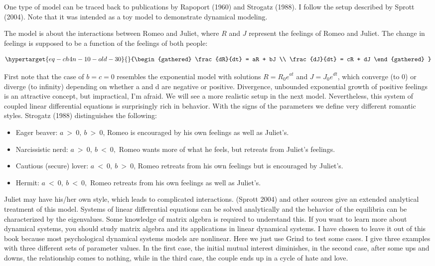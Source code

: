 \documentclass[
  a4paper,
  DIV=11,
  numbers=noendperiod]{scrreprt}
\begin{document}
One type of model can be traced back to publications by Rapoport (1960)
and Strogatz (1988). I follow the setup described by Sprott (2004). Note
that it was intended as a toy model to demonstrate dynamical modeling.

The model is about the interactions between Romeo and Juliet, where
\(R\) and \(J\) represent the feelings of Romeo and Juliet. The change
in feelings is supposed to be a function of the feelings of both people:

\begin{equation}\protect\hypertarget{eq-ch4n-10-old-30}{}{\begin{gathered}
\frac{dR}{dt} = aR + bJ \\
\frac{dJ}{dt} = cR + dJ
\end{gathered}
}\label{eq-ch4n-10-old-30}\end{equation}

First note that the case of \(b = c = 0\) resembles the exponential
model with solutions \(R = {R_{0}e}^{at}\) and \(J = {J_{0}e}^{dt}\),
which converge (to 0) or diverge (to infinity) depending on whether a
and d are negative or positive. Divergence, unbounded exponential growth
of positive feelings is an attractive concept, but impractical, I'm
afraid. We will see a more realistic setup in the next model.
Nevertheless, this system of coupled linear differential equations is
surprisingly rich in behavior. With the signs of the parameters we
define very different romantic styles. Strogatz (1988) distinguishes the
following:

\begin{itemize}
\item
  Eager beaver: \(a\  > \ 0,\ b\  > \ 0\), Romeo is encouraged by his
  own feelings as well as Juliet's.
\item
  Narcissistic nerd: \(a\  > \ 0,\ b\  < \ 0,\) Romeo wants more of what
  he feels, but retreats from Juliet's feelings.
\item
  Cautious (secure) lover: \(a\  < \ 0,\ b\  > \ 0\), Romeo retreats
  from his own feelings but is encouraged by Juliet's.
\item
  Hermit: \(a\  < \ 0,\ b\  < \ 0,\) Romeo retreats from his own
  feelings as well as Juliet's.
\end{itemize}

Juliet may have his/her own style, which leads to complicated
interactions. (Sprott 2004) and other sources give an extended
analytical treatment of this model. Systems of linear differential
equations can be solved analytically and the behavior of the equilibria
can be characterized by the eigenvalues. Some knowledge of matrix
algebra is required to understand this. If you want to learn more about
dynamical systems, you should study matrix algebra and its applications
in linear dynamical systems. I have chosen to leave it out of this book
because most psychological dynamical systems models are nonlinear. Here
we just use Grind to test some cases. I give three examples with three
different sets of parameter values. In the first case, the initial
mutual interest diminishes, in the second case, after some ups and
downs, the relationship comes to nothing, while in the third case, the
couple ends up in a cycle of hate and love.
\end{document}

